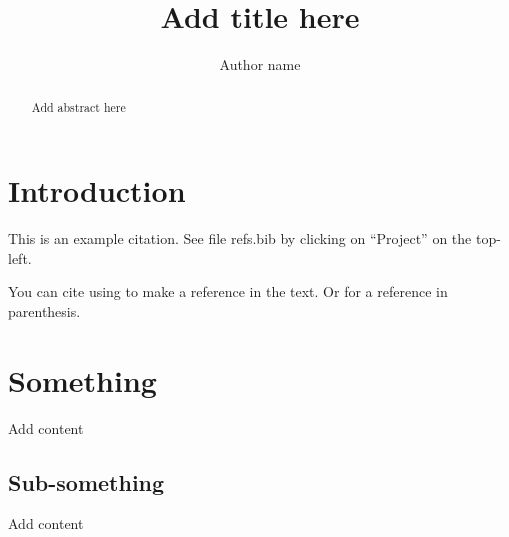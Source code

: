 \documentclass[a4paper, 12pt, one column]{article}
\title{Add title here}
\author{Author name}
\begin{document}
\maketitle

\begin{abstract}
Add abstract here
\end{abstract}

\section{Introduction}

This is an example citation. See file refs.bib by clicking on ``Project'' on the top-left. 

You can cite using \citet{Claydon17} to make a reference in the text. Or \citep{Claydon17} for a reference in parenthesis. 

\section{Something}

Add content

\subsection{Sub-something}

Add content


\end{document}
